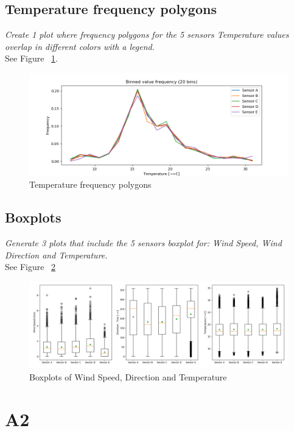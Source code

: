 \documentclass{article}
\begin{document}
\newpage

\subsection{Temperature frequency polygons}
\textit{
Create 1 plot where frequency polygons for the 5 sensors Temperature values overlap in different colors with a legend.
}\\

See Figure ~\ref{fig:1-3}.

\begin{figure}[!htb]
\centering
\includegraphics[width=\textwidth]{1-3-freq.png}
\caption{Temperature frequency polygons}
\label{fig:1-3}
\end{figure}

\subsection{Boxplots}
\textit{
Generate 3 plots that include the 5 sensors boxplot for: Wind Speed, Wind Direction and Temperature.
}\\

See Figure ~\ref{fig:1-4}

\begin{figure}[!htb]
\centering
\includegraphics[width=\textwidth]{1-4-box.png}
\caption{Boxplots of Wind Speed, Direction and Temperature}
\label{fig:1-4}
\end{figure}

\newpage

\section{A2}
\end{document}
